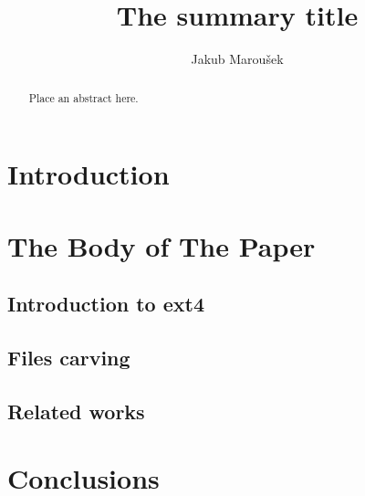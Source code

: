 \documentclass{acm_proc_article-sp}
\begin{document}
\title{The summary title}

\author{
\alignauthor
Jakub Marou\v sek
}

\maketitle
\begin{abstract}
Place an abstract here.
\end{abstract}

\section{Introduction}

\cite{braams:babel}

\section{The {\secit Body} of The Paper}

\subsection{Introduction to ext4}

\subsection{Files carving}

\subsection{Related works}

\section{Conclusions}




\balancecolumns
\end{document}
